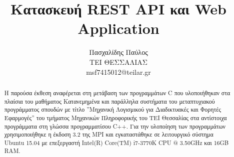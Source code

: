 \documentclass[10pt,a4paper]{article}
\title{Κατασκευή REST API και Web Application}
\author{Πασχαλίδης Παύλος\\ΤΕΙ ΘΕΣΣΑΛΙΑΣ\\msf7415012@teilar.gr}
\date{}
\begin{document}
	
	\maketitle
	\newpage	
			
	\begin{abstract}
	Η παρούσα έκθεση αναφέρεται στη μετάβαση των προγραμμάτων C που υλοποιήθηκαν στα πλαίσια του μαθήματος Κατανεμημένα και παράλληλα συστήματα του μεταπτυχιακού προγράμματος σπουδών με τίτλο ''Μηχανική Λογισμικού για Διαδικτυακές και Φορητές Εφαρμογές'' του τμήματος Μηχανικών Πληροφορικής του ΤΕΙ Θεσσαλίας στα αντίστοιχα προγράμματα στη γλώσσα προγραμματίσου C++. Για την υλοποίηση των προγραμμάτων χρησιμοποιήθηκε η έκδοση 3.2 της MPI και εγκαταστάθηκε σε λειτουργικό σύστημα Ubuntu 15.04 με επεξεργαστή Intel(R) Core(TM) i7-3770K CPU @ 3.50GHz και 16GB RAM.
	\end{abstract}

	
	

			
%	
%	
%	
	
	
%	
	
\end{document}
